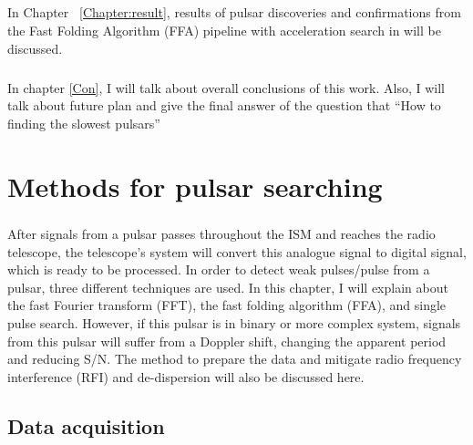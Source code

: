 \documentclass[thesis_msc.tex]{subfiles}
\begin{document}
    \paragraph{} In Chapter ~\ref{Chapter:result}, results of pulsar discoveries and confirmations from the Fast Folding Algorithm (FFA) pipeline with acceleration search in will be discussed. 
    
    \paragraph{} In chapter \ref{Con}, I will talk about overall conclusions of this work. Also, I will talk about future plan and give the final answer of the question that ``How to finding the slowest pulsars''  
    
\chapter{Methods for pulsar searching} \label{Methods}
\paragraph{} After signals from a pulsar passes throughout the ISM and reaches the radio telescope, the telescope's system will convert this analogue signal to digital signal, which is ready to be processed. In order to detect weak pulses/pulse from a pulsar, three different techniques are used. In this chapter, I will explain about the fast Fourier transform (FFT), the fast folding algorithm (FFA), and single pulse search. However, if this pulsar is in binary or more complex system, signals from this pulsar will suffer from a Doppler shift, changing the apparent period and reducing S/N. The method to prepare the data and mitigate radio frequency interference (RFI) and de-dispersion will also be discussed here. 
    \section{Data acquisition}
\end{document}
